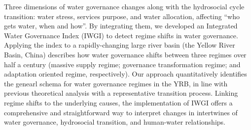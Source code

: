 
Three dimensions of water governance changes along with the hydrosocial cycle transition: water stress, services purpose, and water allocation, affecting ``who gets water, when and how''. By integrating them, we developed an Integrated Water Governance Index (IWGI) to detect regime shifts in water governance. Applying the index to a rapidly-changing large river basin (the Yellow River Basin, China) describes how water governance shifts between three regimes over half a century (massive supply regime; governance transformation regime; and adaptation oriented regime, respectively). Our approach quantitatively identifies the genearl schema for water governance regimes in the YRB, in line with previous theoretical analysis with a representative transition process. Linking regime shifts to the underlying causes, the implementation of IWGI offers a comprehensive and straightforward way to interpret changes in intertwines of water governance, hydrosocial transition, and human-water relationships.
